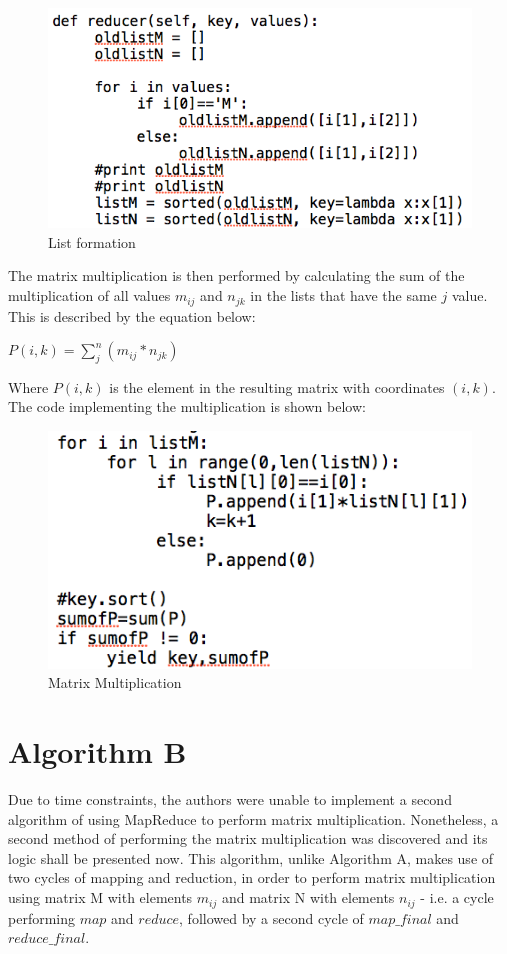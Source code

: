 \documentclass[journal, a4paper]{IEEEtran}
\begin{document}
 \begin{figure}[hbtp!]
		\centering
		\includegraphics[scale = 0.4]{ListM}
		\caption{List formation}
		\label {code}
	\end{figure}
 
 
\noindent
The matrix multiplication is then performed by calculating the sum of the multiplication of all values $m_{ij}$ and $n_{jk}$ in the lists that have the same $j$ value. This is described by the equation below: 

\begin{center}
$P(i,k) =  \sum_{j}^{n}(m_{ij}*n_{jk})$\\
\end{center}

\noindent
Where $P(i,k)$ is the element in the resulting matrix with coordinates $(i,k)$.
The code implementing the multiplication is shown below:

\begin{figure}[hbtp!]
		\centering
		\includegraphics[scale = 0.4]{MM}
		\caption{Matrix Multiplication}
		\label {code}
	\end{figure}
    
\section{Algorithm B}
Due to time constraints, the authors were unable to implement a second algorithm of using MapReduce to perform matrix multiplication. Nonetheless, a second method of performing the matrix multiplication was discovered and its logic shall be presented now. This algorithm, unlike Algorithm A, makes use of two cycles of mapping and reduction, in order to perform matrix multiplication using matrix M with elements $m_{ij}$  and matrix N with elements $n_{ij}$ - i.e. a cycle performing $map$ and $reduce$, followed by a second cycle of $map\_final$ and $reduce\_final$.
\end{document}
